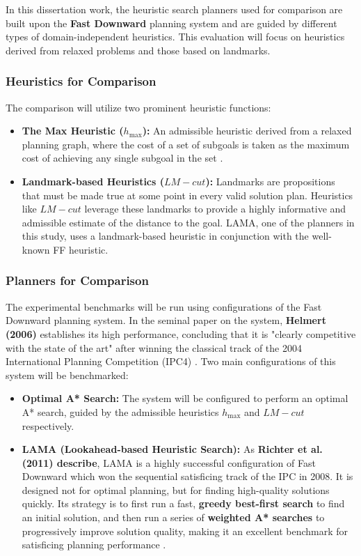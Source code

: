 \documentclass[12pt, a4paper, oneside]{report} %
\begin{document}
In this dissertation work, the heuristic search planners used for comparison are built upon the \textbf{Fast Downward} planning system and are guided by different types of domain-independent heuristics. This evaluation will focus on heuristics derived from relaxed problems and those based on landmarks.
\subsubsection*{Heuristics for Comparison}
The comparison will utilize two prominent heuristic functions:
\begin{itemize}
    \item \textbf{The Max Heuristic ($h_{\max}$):} An admissible heuristic derived from a relaxed planning graph, where the cost of a set of subgoals is taken as the maximum cost of achieving any single subgoal in the set \cite{bonet2001planning}.
    \item \textbf{Landmark-based Heuristics ($LM-cut$):} Landmarks are propositions that must be made true at some point in every valid solution plan. Heuristics like $LM-cut$ leverage these landmarks to provide a highly informative and admissible estimate of the distance to the goal. LAMA, one of the planners in this study, uses a landmark-based heuristic in conjunction with the well-known FF heuristic\cite{richter2011lama}.
\end{itemize}


\subsubsection*{Planners for Comparison}
The experimental benchmarks will be run using configurations of the Fast Downward planning system. In the seminal paper on the system, \textbf{Helmert (2006)} establishes its high performance, concluding that it is "clearly competitive with the state of the art" after winning the classical track of the 2004 International Planning Competition (IPC4) \cite{helmert2006fast}. Two main configurations of this system will be benchmarked:
\begin{itemize}
    \item \textbf{Optimal A* Search:} The system will be configured to perform an optimal A* search, guided by the admissible heuristics $h_{\max}$ and $LM-cut$ respectively.
    \item \textbf{LAMA (Lookahead-based Heuristic Search):} As \textbf{Richter et al. (2011) describe}, LAMA is a highly successful configuration of Fast Downward which won the sequential satisficing track of the IPC in 2008. It is designed not for optimal planning, but for finding high-quality solutions quickly. Its strategy is to first run a fast, \textbf{greedy best-first search} to find an initial solution, and then run a series of \textbf{weighted A* searches} to progressively improve solution quality, making it an excellent benchmark for satisficing planning performance \cite{richter2011lama}.
\end{itemize}
\end{document}
